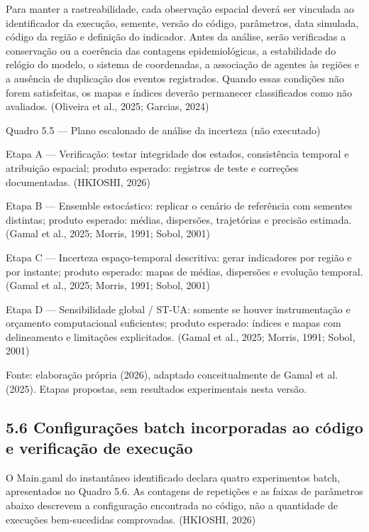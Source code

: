 Para manter a rastreabilidade, cada observação espacial deverá ser
vinculada ao identificador da execução, semente, versão do código,
parâmetros, data simulada, código da região e definição do indicador.
Antes da análise, serão verificadas a conservação ou a coerência das
contagens epidemiológicas, a estabilidade do relógio do modelo, o
sistema de coordenadas, a associação de agentes às regiões e a ausência
de duplicação dos eventos registrados. Quando essas condições não forem
satisfeitas, os mapas e índices deverão permanecer classificados como
não avaliados. (Oliveira et al., 2025; Garcias, 2024)

Quadro 5.5 --- Plano escalonado de análise da incerteza (não executado)

Etapa A --- Verificação: testar integridade dos estados, consistência
temporal e atribuição espacial; produto esperado: registros de teste e
correções documentadas. (HKIOSHI, 2026)

Etapa B --- Ensemble estocástico: replicar o cenário de referência com
sementes distintas; produto esperado: médias, dispersões, trajetórias e
precisão estimada. (Gamal et al., 2025; Morris, 1991; Sobol, 2001)

Etapa C --- Incerteza espaço-temporal descritiva: gerar indicadores por
região e por instante; produto esperado: mapas de médias, dispersões e
evolução temporal. (Gamal et al., 2025; Morris, 1991; Sobol, 2001)

Etapa D --- Sensibilidade global / ST-UA: somente se houver
instrumentação e orçamento computacional suficientes; produto esperado:
índices e mapas com delineamento e limitações explicitados. (Gamal et
al., 2025; Morris, 1991; Sobol, 2001)

Fonte: elaboração própria (2026), adaptado conceitualmente de Gamal et
al. (2025). Etapas propostas, sem resultados experimentais nesta versão.

\subsection{5.6 Configurações batch incorporadas ao código e verificação
de
execução}\label{configurauxe7uxf5es-batch-incorporadas-ao-cuxf3digo-e-verificauxe7uxe3o-de-execuuxe7uxe3o}

O Main.gaml do instantâneo identificado declara quatro experimentos
batch, apresentados no Quadro 5.6. As contagens de repetições e as
faixas de parâmetros abaixo descrevem a configuração encontrada no
código, não a quantidade de execuções bem-sucedidas comprovadas.
(HKIOSHI, 2026)

